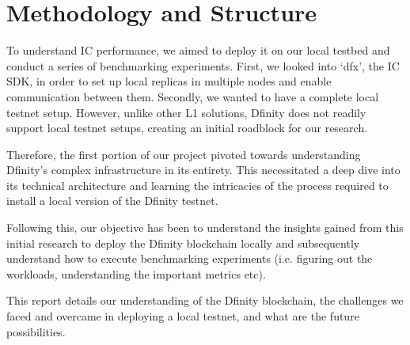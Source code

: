 \section{Methodology and Structure}

To understand IC performance, we aimed to deploy it on our local testbed and conduct a series of benchmarking experiments. First, we 
looked into `dfx', the IC SDK, in order to set up local replicas in multiple nodes and enable communication between them. Secondly, 
we wanted to have a complete local testnet setup. However, unlike other L1 solutions, Dfinity does not readily support local 
testnet setups, creating an initial roadblock for our research.

Therefore, the first portion of our project pivoted towards understanding Dfinity's complex infrastructure in its entirety. This 
necessitated a deep dive into its technical architecture and learning the intricacies of the process required to install a local 
version of the Dfinity testnet.

Following this, our objective has been to understand the insights gained from this initial research to deploy the Dfinity blockchain 
locally and subsequently understand how to execute benchmarking experiments (i.e. figuring out the workloads, understanding the 
important metrics etc).

This report details our understanding of the Dfinity blockchain, the challenges we faced and overcame in deploying a local testnet, 
and what are the future possibilities. 
